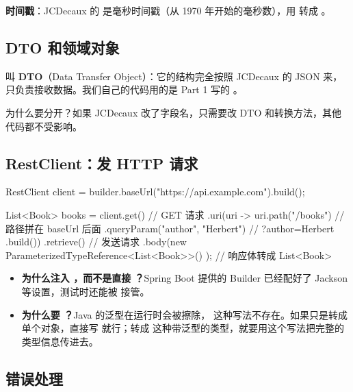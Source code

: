 \textbf{时间戳}：JCDecaux 的  是毫秒时间戳（从 1970 年开始的毫秒数），用  转成 。

\subsection{DTO 和领域对象}

 叫 \textbf{DTO}（Data Transfer Object）：它的结构完全按照 JCDecaux 的 JSON 来，只负责接收数据。我们自己的代码用的是 Part 1 写的 。

为什么要分开？如果 JCDecaux 改了字段名，只需要改 DTO 和转换方法，其他代码都不受影响。

\subsection{RestClient：发 HTTP 请求}

\begin{java}
RestClient client = builder.baseUrl("https://api.example.com").build();

List<Book> books = client.get()                                  // GET 请求
        .uri(uri -> uri.path("/books")                           // 路径拼在 baseUrl 后面
                .queryParam("author", "Herbert")                 // ?author=Herbert
                .build())
        .retrieve()                                              // 发送请求
        .body(new ParameterizedTypeReference<List<Book>>() {});  // 响应体转成 List<Book>
\end{java}

\begin{itemize}
  \item \textbf{为什么注入 ，而不是直接 ？}Spring Boot 提供的 Builder 已经配好了 Jackson 等设置，测试时还能被  接管。
  \item \textbf{为什么要 ？}Java 的泛型在运行时会被擦除， 这种写法不存在。如果只是转成单个对象，直接写  就行；转成  这种带泛型的类型，就要用这个写法把完整的类型信息传进去。
\end{itemize}

\subsection{错误处理}

